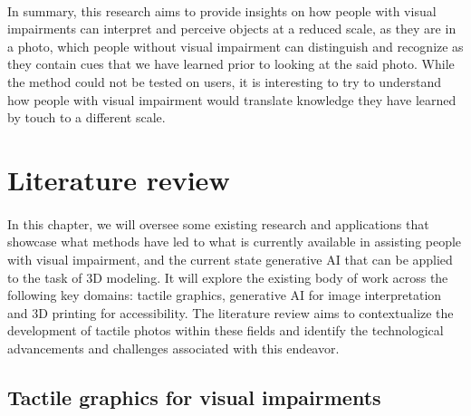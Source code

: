 \documentclass[12pt, letterpaper]{article}
\begin{document}
\begin{spacing}{1.15}
\paragraph{}
In summary, this research aims to provide insights on how people with visual impairments can interpret and perceive objects at a reduced scale, as they
are in a photo, which people without visual impairment can distinguish and recognize as they contain cues that we have learned prior to looking at the
said photo. While the method could not be tested on users, it is interesting to try to understand how people with visual impairment would translate
knowledge they have learned by touch to a different scale.

\newpage



\section{Literature review}
\paragraph{}
In this chapter, we will oversee some existing research and applications that showcase what methods have led to what is currently available in assisting people with
visual impairment, and the current state generative AI that can be applied to the task of 3D modeling. It will explore the existing body of work
across the following key domains: tactile graphics, generative AI for image interpretation and 3D printing for accessibility. The literature review
aims to contextualize the development of tactile photos within these fields and identify the technological advancements and challenges associated with this endeavor.

\subsection{Tactile graphics for visual impairments}

\end{spacing}
\end{document}
